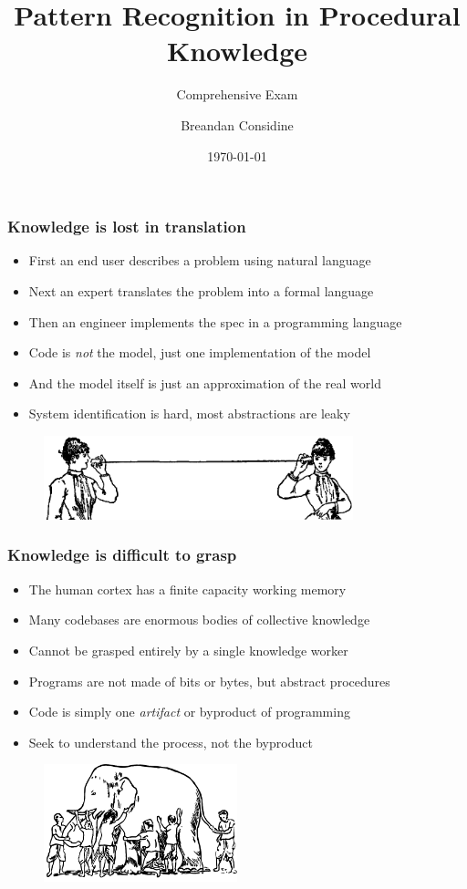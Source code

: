 \documentclass{beamer}
\title{Pattern Recognition in Procedural Knowledge}
\subtitle{Comprehensive Exam}
\author{Breandan Considine}
\institute[McGill]{
McGill University \\
\medskip
\textit{breandan.considine@mcgill.ca}
}
\date{\today}
\begin{document}
\begin{frame}
  \titlepage
\end{frame}

\begin{frame}
  \frametitle{Knowledge is lost in translation}
  \begin{itemize}
    \item First an end user describes a problem using natural language
    \item Next an expert translates the problem into a formal language
    \item Then an engineer implements the spec in a programming language
    \item Code is \textit{not} the model, just one implementation of the model
    \item And the model itself is just an approximation of the real world
    \item System identification is hard, most abstractions are leaky
  \end{itemize}
  \begin{figure}[H]
    \centering
    \includegraphics[width=0.8\textwidth]{../clipart/tincan.jpg}
  \end{figure}
\end{frame}

\begin{frame}
  \frametitle{Knowledge is difficult to grasp}
  \begin{itemize}
    \item The human cortex has a finite capacity working memory
    \item Many codebases are enormous bodies of collective knowledge
    \item Cannot be grasped entirely by a single knowledge worker
    \item Programs are not made of bits or bytes, but abstract procedures
    \item Code is simply one \textit{artifact} or byproduct of programming
    \item Seek to understand the process, not the byproduct
  \end{itemize}
  \begin{figure}[H]
    \centering
    \includegraphics[width=0.5\textwidth]{../clipart/elephant.png}
  \end{figure}
\end{frame}
\end{document}
